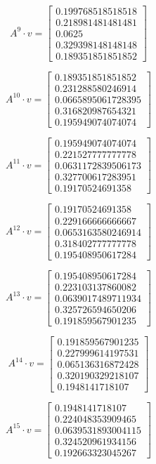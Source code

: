 \documentclass{article}
\begin{document}
$$A^{9} \cdot v = \begin{bmatrix}
0.199768518518518\\
0.218981481481481\\
0.0625\\
0.329398148148148\\
0.189351851851852
\end{bmatrix}
$$

$$A^{10} \cdot v = \begin{bmatrix}
0.189351851851852\\
0.231288580246914\\
0.0665895061728395\\
0.316820987654321\\
0.195949074074074
\end{bmatrix}
$$

$$A^{11} \cdot v = \begin{bmatrix}
0.195949074074074\\
0.221527777777778\\
0.0631172839506173\\
0.327700617283951\\
0.19170524691358
\end{bmatrix}
$$

$$A^{12} \cdot v = \begin{bmatrix}
0.19170524691358\\
0.229166666666667\\
0.0653163580246914\\
0.318402777777778\\
0.195408950617284
\end{bmatrix}
$$

$$A^{13} \cdot v = \begin{bmatrix}
0.195408950617284\\
0.223103137860082\\
0.0639017489711934\\
0.325726594650206\\
0.191859567901235
\end{bmatrix}
$$

$$A^{14} \cdot v = \begin{bmatrix}
0.191859567901235\\
0.227999614197531\\
0.065136316872428\\
0.320190329218107\\
0.1948141718107
\end{bmatrix}
$$

$$A^{15} \cdot v = \begin{bmatrix}
0.1948141718107\\
0.224048353909465\\
0.0639531893004115\\
0.324520961934156\\
0.192663323045267
\end{bmatrix}
$$
\end{document}
